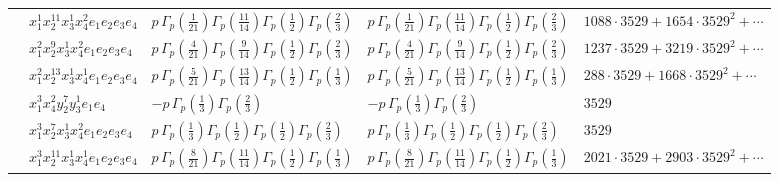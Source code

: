 \documentclass[11pt]{article}
\begin{document}
\begin{table}[ht]
{\begin{tabular}{@{}lllll@{}}
 & $x_{1}^{1} x_{2}^{11} x_{3}^{1} x_{4}^{2}  e_{1} e_{2} e_{3} e_{4}$ & $p \, \Gamma_p \left( \frac{1}{21} \right) \Gamma_p \left( \frac{11}{14} \right) \Gamma_p \left( \frac{1}{2} \right) \Gamma_p \left( \frac{2}{3} \right)$ & $p \, \Gamma_p \left( \frac{1}{21} \right) \Gamma_p \left( \frac{11}{14} \right) \Gamma_p \left( \frac{1}{2} \right) \Gamma_p \left( \frac{2}{3} \right)$ & $1088{\cdot}3529{+}1654{\cdot}3529^{2}{+}\cdots$ \\
 & $x_{1}^{2} x_{2}^{9} x_{3}^{1} x_{4}^{2}  e_{1} e_{2} e_{3} e_{4}$ & $p \, \Gamma_p \left( \frac{4}{21} \right) \Gamma_p \left( \frac{9}{14} \right) \Gamma_p \left( \frac{1}{2} \right) \Gamma_p \left( \frac{2}{3} \right)$ & $p \, \Gamma_p \left( \frac{4}{21} \right) \Gamma_p \left( \frac{9}{14} \right) \Gamma_p \left( \frac{1}{2} \right) \Gamma_p \left( \frac{2}{3} \right)$ & $1237{\cdot}3529{+}3219{\cdot}3529^{2}{+}\cdots$ \\
 & $x_{1}^{2} x_{2}^{13} x_{3}^{1} x_{4}^{1}  e_{1} e_{2} e_{3} e_{4}$ & $p \, \Gamma_p \left( \frac{5}{21} \right) \Gamma_p \left( \frac{13}{14} \right) \Gamma_p \left( \frac{1}{2} \right) \Gamma_p \left( \frac{1}{3} \right)$ & $p \, \Gamma_p \left( \frac{5}{21} \right) \Gamma_p \left( \frac{13}{14} \right) \Gamma_p \left( \frac{1}{2} \right) \Gamma_p \left( \frac{1}{3} \right)$ & $288{\cdot}3529{+}1668{\cdot}3529^{2}{+}\cdots$ \\
 & $x_{1}^{3} x_{4}^{2} y_{2}^{7} y_{3}^{1} e_{1} e_{4}$ & $- p \, \Gamma_p \left( \frac{1}{3} \right) \Gamma_p \left( \frac{2}{3} \right)$ & $- p \, \Gamma_p \left( \frac{1}{3} \right) \Gamma_p \left( \frac{2}{3} \right)$ & $3529$ \\
 & $x_{1}^{3} x_{2}^{7} x_{3}^{1} x_{4}^{2}  e_{1} e_{2} e_{3} e_{4}$ & $p \, \Gamma_p \left( \frac{1}{3} \right) \Gamma_p \left( \frac{1}{2} \right) \Gamma_p \left( \frac{1}{2} \right) \Gamma_p \left( \frac{2}{3} \right)$ & $p \, \Gamma_p \left( \frac{1}{3} \right) \Gamma_p \left( \frac{1}{2} \right) \Gamma_p \left( \frac{1}{2} \right) \Gamma_p \left( \frac{2}{3} \right)$ & $3529$ \\
 & $x_{1}^{3} x_{2}^{11} x_{3}^{1} x_{4}^{1}  e_{1} e_{2} e_{3} e_{4}$ & $p \, \Gamma_p \left( \frac{8}{21} \right) \Gamma_p \left( \frac{11}{14} \right) \Gamma_p \left( \frac{1}{2} \right) \Gamma_p \left( \frac{1}{3} \right)$ & $p \, \Gamma_p \left( \frac{8}{21} \right) \Gamma_p \left( \frac{11}{14} \right) \Gamma_p \left( \frac{1}{2} \right) \Gamma_p \left( \frac{1}{3} \right)$ & $2021{\cdot}3529{+}2903{\cdot}3529^{2}{+}\cdots$ \\

\end{tabular}}
\end{table}
\end{document}
